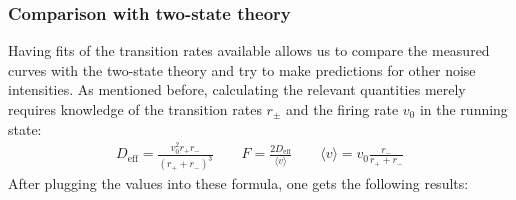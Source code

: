 \documentclass[12pt,a4paper]{article}
\begin{document}
\subsubsection{Comparison with two-state theory}\label{tstsn}
Having fits of the transition rates available allows us to compare the measured curves with the two-state theory and try to make predictions for other noise intensities. As mentioned before, calculating the relevant quantities merely requires knowledge of the transition rates $r_\pm$ and the firing rate $v_0$ in the running state:
\begin{align*}
D_{\text{eff}}=\frac{v_0^2 r_+r_-}{(r_++r_-)^3}\qquad F=\frac{2D_{\text{eff}}}{\langle v\rangle}\qquad\langle v\rangle=v_0\frac{r_-}{r_++r_-}
\end{align*}
After plugging the values into these formula, one gets the following results:
\end{document}
